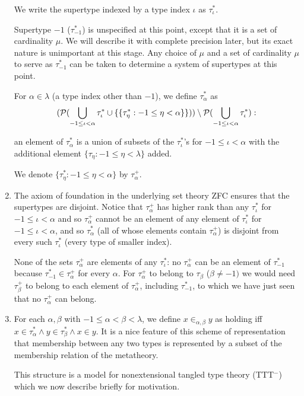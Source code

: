 \documentclass[12pt]{article}
\begin{document}
\begin{enumerate}
We write the supertype indexed by a type index $\iota$ as $\tau^*_\iota$.

Supertype $-1$ ($\tau^*_{-1}$) is unspecified at this point, except that it is a set of cardinality $\mu$.  We will describe it with complete precision later, but its exact nature is unimportant at this stage.  Any choice of $\mu$ and a set of cardinality $\mu$ to serve as $\tau^*_{-1}$ can be taken to determine a system of supertypes at this point.

For $\alpha\in \lambda$ (a type index other than $-1$), we define $\tau^*_\alpha$ as $$({\cal P} (\bigcup_{-1 \leq \iota<\alpha} \tau^*_\iota \cup \{\{\tau^*_\eta:-1\leq \eta <\alpha\}\})) \setminus {\cal P} (\bigcup_{-1 \leq \iota<\alpha}\tau^*_\iota):$$

an element of $\tau^*_\alpha$ is a union of subsets of the $\tau^*_\iota$'s for $-1\leq \iota <\alpha$ with the additional element $\{\tau_\eta:-1\leq \eta <\lambda\}$ added.

We denote $\{\tau^*_\eta:-1\leq \eta <\alpha\}$ by $\tau^+_{\alpha}$.

\item The axiom of foundation in the underlying set theory ZFC ensures that the supertypes are disjoint.  Notice that $\tau^+_{\alpha}$ has higher rank than any $\tau^*_\iota$ for
$-1\leq \iota <\alpha$ and so $\tau^+_{\alpha}$ cannot be an element of any element of $\tau^*_\iota$ for $-1\leq \iota<\alpha$, and so $\tau^*_\alpha$ (all of whose elements contain $\tau^+_{\alpha}$)  is disjoint from every
such $\tau^*_\iota$ (every type of smaller index).

None of the sets $\tau^+_{\alpha}$ are elements of any $\tau^*_\iota$:  no  $\tau^+_{\alpha}$ can be an element of $\tau^*_{-1}$ because $\tau^*_{-1} \in \tau^+_{\alpha}$ for every
$\alpha$.  For $\tau^+_{\alpha}$ to belong to $\tau_\beta$ ($\beta \neq -1)$ we would need $\tau^+_{\beta}$ to belong to each element of $\tau^+_\alpha$, including
$\tau^*_{-1}$, to which we have just seen that no $\tau^+_{\alpha}$ can belong.

\item For each $\alpha,\beta$ with $-1\leq\alpha<\beta<\lambda$, we define $x \in_{\alpha,\beta} y$ as holding iff $x \in \tau^*_\alpha \wedge y \in \tau^*_\beta \wedge x \in y$.  It is a nice feature of this scheme of representation that membership
between any two types is represented by a subset of the membership relation of the metatheory.

This structure is a model for nonextensional tangled type theory (TTT$^-$) which we now describe briefly for motivation.


\end{enumerate}
\end{document}
